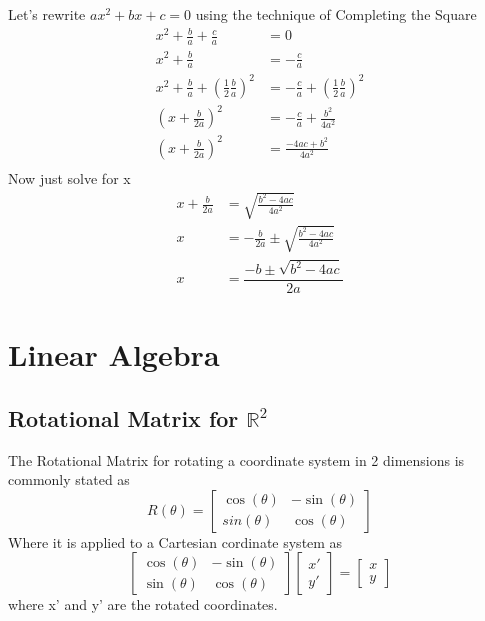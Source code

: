 \documentclass[11pt]{book}
\begin{document}
Let's rewrite \(ax^2+bx+c = 0 \) using the technique of Completing the Square \\
\begin{align*}
x^2 + \frac{b}{a} + \frac{c}{a} &= 0 \\
x^2 + \frac{b}{a} &= -\frac{c}{a} \\
x^2 + \frac{b}{a} + \left(\frac{1}{2}\frac{b}{a}\right)^2 &= -\frac{c}{a} + \left(\frac{1}{2}\frac{b}{a}\right)^2 \\
\left(x + \frac{b}{2a}\right)^2 &= -\frac{c}{a} + \frac{b^2}{4a^2} \\
\left(x + \frac{b}{2a}\right)^2 &= \frac{-4ac +b^2}{4a^2} \\
\end{align*}
Now just solve for x
\begin{align*}
x + \frac{b}{2a} &= \sqrt{\frac{b^2 -4ac}{4a^2}} \\
x  &= -\frac{b}{2a} \pm \sqrt{\frac{b^2 -4ac}{4a^2}}  \\
x &= \dfrac{-b \pm \sqrt{b^2 -4ac}}{2a}
\end{align*}

\chapter{Linear Algebra}

\section{Rotational Matrix for $\mathbb{R}^2$}
The Rotational Matrix for rotating a coordinate system in 2 dimensions is commonly stated as
\[
R(\theta) = \left[ \begin{matrix}
\cos(\theta) & -\sin(\theta) \\
sin(\theta) &  \cos(\theta) 
\end{matrix}\right]
\]
Where it is applied to a Cartesian cordinate system as
\[
\left[ \begin{matrix}
\cos(\theta) & -\sin(\theta) \\
\sin(\theta) &  \cos(\theta) 
\end{matrix}\right] 
\left[ \begin{matrix}
x' \\
y'
\end{matrix} \right] =
\left[ \begin{matrix}
x \\
y
\end{matrix} \right]
\]
where x' and y' are the rotated coordinates.
\end{document}
